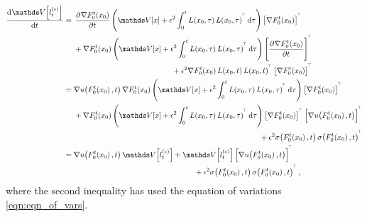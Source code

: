 \begin{align*}
	\dod{\var{l_t^{(\epsilon)}}}{t} & = \begin{multlined}[t]
		                                    \dpd{\nabla F_0^t\!\left(x_0\right)}{t}\left(\var{x} + \epsilon^2 \int_0^t{L\!\left(x_0, \tau\right)L\!\left(x_0, \tau\right)^{\T}\dif\tau} \right)\left[\nabla F_0^t\!\left(x_0\right)\right]^{\T} \\
		                                    + \nabla F_0^t\!\left(x_0\right)\left(\var{x} + \epsilon^2 \int_0^t{L\!\left(x_0, \tau\right)L\!\left(x_0, \tau\right)^{\T}\dif\tau} \right)\left[\dpd{\nabla F_0^t\!\left(x_0\right)}{t}\right]^{\T} \\
		                                    + \epsilon^2\nabla F_0^t\!\left(x_0\right)L\!\left(x_0, t\right) L\!\left(x_0, t\right)^{\T}\left[\nabla F_0^t\!\left(x_0\right)\right]^{\T}
	                                    \end{multlined}                                                             \\
	                                & = \begin{multlined}[t]
		                                    \nabla u\!\left(F_0^t\!\left(x_0\right), t\right)\nabla F_0^t\!\left(x_0\right)\left(\var{x} + \epsilon^2 \int_0^t{L\!\left(x_0, \tau\right)L\!\left(x_0, \tau\right)^{\T}\dif\tau} \right)\left[\nabla F_0^t\!\left(x_0\right)\right]^{\T} \\
		                                    + \nabla F_0^t\!\left(x_0\right)\left(\var{x} + \epsilon^2 \int_0^t{L\!\left(x_0, \tau\right)L\!\left(x_0, \tau\right)^{\T}\dif\tau} \right)\left[\nabla F_0^t\!\left(x_0\right)\right]^{\T}\left[\nabla u\!\left(F_0^t\!\left(x_0\right), t\right)\right]^{\T} \\
		                                    + \epsilon^2\sigma\!\left(F_0^t\!\left(x_0\right), t\right)\sigma\!\left(F_0^t\!\left(x_0\right), t\right)^{\T}
	                                    \end{multlined} \\
	                                & = \begin{multlined}[t]
		                                    \nabla u\!\left(F_0^t\!\left(x_0\right), t\right) \var{l_t^{(\epsilon)}} + \var{l_t^{(\epsilon)}}\left[\nabla u\!\left(F_0^t\!\left(x_0\right), t\right)\right]^{\T} \\
		                                    + \epsilon^2\sigma\!\left(F_0^t\!\left(x_0\right), t\right)\sigma\!\left(F_0^t\!\left(x_0\right), t\right)^{\T},
	                                    \end{multlined}
\end{align*}
where the second inequality has used the equation of variations \cref{eqn:eqn_of_vars}.



